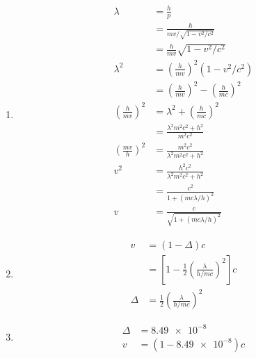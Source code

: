 \documentclass{article}
\begin{document}
\begin{enumerate}
  \item

        \begin{align*}
          \lambda                        & = \frac{h}{p}                                                     \\
                                         & = \frac{h}{mv / \sqrt{1 - v^2 / c^2}}                             \\
                                         & = \frac{h}{m v} \sqrt{1 - v^2 / c^2}                              \\
          \lambda^2                      & = \left( \frac{h}{m v} \right)^2 (1 - v^2 / c^2)                  \\
                                         & = \left( \frac{h}{m v} \right)^2 - \left( \frac{h}{m c} \right)^2 \\
          \left( \frac{h}{m v} \right)^2 & = \lambda^2 + \left( \frac{h}{m c} \right)^2                      \\
                                         & = \frac{\lambda^2 m^2 c^2 + h^2}{m^2 c^2}                         \\
          \left( \frac{m v}{h} \right)^2 & = \frac{m^2 c^2}{\lambda^2 m^2 c^2 + h^2}                         \\
          v^2                            & = \frac{h^2 c^2}{\lambda^2 m^2 c^2 + h^2}                         \\
                                         & = \frac{c^2}{1 + (m c \lambda / h)^2}                             \\
          v                              & = \frac{c}{\sqrt{1 + (m c \lambda / h)^2}}
        \end{align*}

  \item

        \begin{align*}
          v      & = (1 - \Delta) c                                                            \\
                 & = \left[ 1 - \frac{1}{2} \left( \frac{\lambda}{h / m c} \right)^2 \right] c \\
          \Delta & = \frac{1}{2} \left( \frac{\lambda}{h / m c} \right)^2
        \end{align*}

  \item

        \begin{align*}
          \Delta & = \num{8.49e-8}         \\
          v      & = (1 - \num{8.49e-8}) c
        \end{align*}
\end{enumerate}
\end{document}
